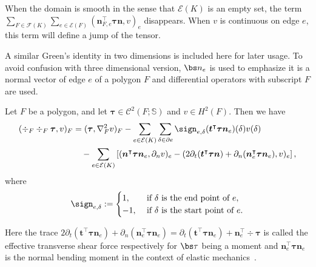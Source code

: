 When the domain is smooth in the sense that $\mathcal E(K)$ is an empty set, the term $\sum\limits_{F\in\mathcal F(K)}\sum\limits_{e\in\mathcal E(F)}(\boldsymbol n_{F,e}^{\intercal}\boldsymbol \tau \boldsymbol n, v)_e $ disappears. When $v$ is continuous on edge $e$, this term will define a jump of the tensor. 

A similar Green's identity in two dimensions is included here for later usage. To avoid confusion with three dimensional version, $\bs n_e$ is used to emphasize it is a normal vector of edge $e$ of a polygon $F$ and differential operators with subscript $F$ are used. 
\begin{lemma} \label{lm:Green2D}
Let $F$ be a polygon, and let $\boldsymbol  \tau\in \mathcal C^2(F; \mathbb S)$ and $v\in H^2(F)$. Then we have
\begin{align}
(\div_F\div_F\boldsymbol \tau, v)_F&=(\boldsymbol \tau, \nabla_F^2v)_F -\sum_{e\in\mathcal E(K)}\sum_{\delta\in\partial e}\sign_{e,\delta}(\boldsymbol  t^{\intercal}\boldsymbol \tau\boldsymbol  n_e)(\delta)v(\delta) \notag\\
&\quad - \sum_{e\in\mathcal E(K)}\left[(\boldsymbol  n^{\intercal}\boldsymbol \tau\boldsymbol  n_e, \partial_n v)_{e}-(2\partial_{t}(\boldsymbol  t^{\intercal}\boldsymbol \tau\boldsymbol  n)+\partial_n (\boldsymbol  n_e^{\intercal}\boldsymbol \tau\boldsymbol  n_e),  v)_{e}\right], \notag%
\end{align}
where
\[
\sign_{e,\delta}:=\begin{cases}
1, & \textrm{ if } \delta \textrm{ is the end point of } e, \\
-1, & \textrm{ if } \delta \textrm{ is the start point of } e.
\end{cases}
\]
\end{lemma}
Here the trace $2\partial_{t}(\boldsymbol  t^{\intercal}\boldsymbol \tau\boldsymbol  n_e)+\partial_n (\boldsymbol  n_e^{\intercal}\boldsymbol \tau\boldsymbol  n_e) = \partial_{t}(\boldsymbol  t^{\intercal}\boldsymbol \tau\boldsymbol  n_e)+\boldsymbol  n_e^{\intercal}\div\boldsymbol \tau$ is called the effective transverse shear force respectively for $\bs\tau$ being a moment and $\boldsymbol  n_e^{\intercal}\boldsymbol \tau\boldsymbol  n_e$ is the normal bending moment in the context of elastic mechanics~\cite{FengShi1996}.


